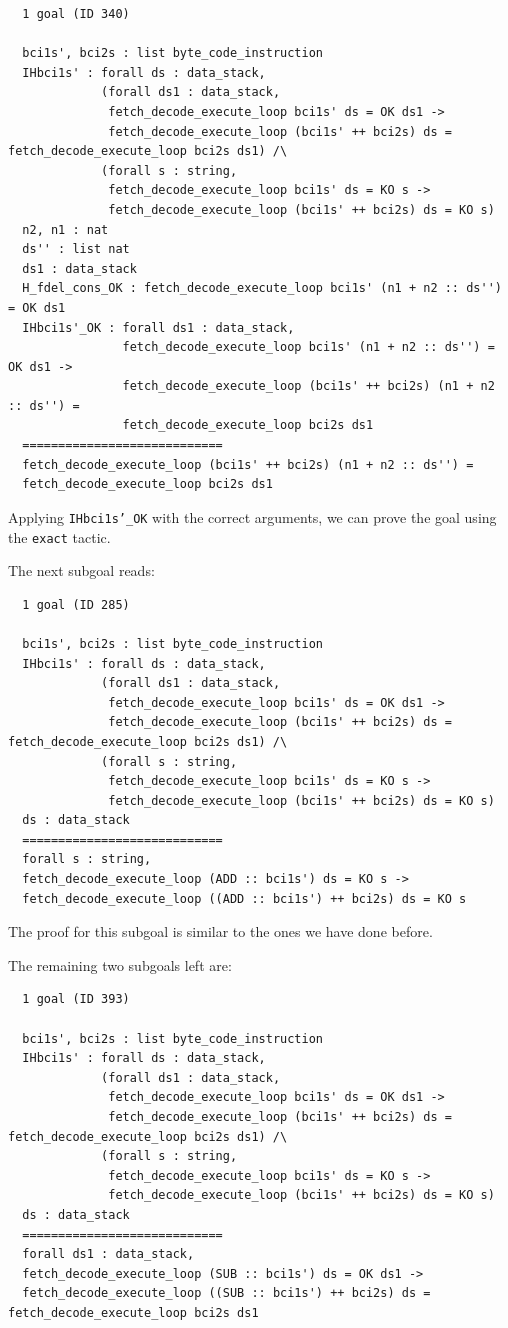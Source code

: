 \documentclass{article}
\begin{document}
\begin{lstlisting}
  1 goal (ID 340)
  
  bci1s', bci2s : list byte_code_instruction
  IHbci1s' : forall ds : data_stack,
             (forall ds1 : data_stack,
              fetch_decode_execute_loop bci1s' ds = OK ds1 ->
              fetch_decode_execute_loop (bci1s' ++ bci2s) ds = fetch_decode_execute_loop bci2s ds1) /\
             (forall s : string,
              fetch_decode_execute_loop bci1s' ds = KO s ->
              fetch_decode_execute_loop (bci1s' ++ bci2s) ds = KO s)
  n2, n1 : nat
  ds'' : list nat
  ds1 : data_stack
  H_fdel_cons_OK : fetch_decode_execute_loop bci1s' (n1 + n2 :: ds'') = OK ds1
  IHbci1s'_OK : forall ds1 : data_stack,
                fetch_decode_execute_loop bci1s' (n1 + n2 :: ds'') = OK ds1 ->
                fetch_decode_execute_loop (bci1s' ++ bci2s) (n1 + n2 :: ds'') =
                fetch_decode_execute_loop bci2s ds1
  ============================
  fetch_decode_execute_loop (bci1s' ++ bci2s) (n1 + n2 :: ds'') =
  fetch_decode_execute_loop bci2s ds1
\end{lstlisting}

Applying \texttt{IHbci1s'\_OK} with the correct arguments, we can prove the goal using the \texttt{exact} tactic.

The next subgoal reads:

\begin{lstlisting}
  1 goal (ID 285)
  
  bci1s', bci2s : list byte_code_instruction
  IHbci1s' : forall ds : data_stack,
             (forall ds1 : data_stack,
              fetch_decode_execute_loop bci1s' ds = OK ds1 ->
              fetch_decode_execute_loop (bci1s' ++ bci2s) ds = fetch_decode_execute_loop bci2s ds1) /\
             (forall s : string,
              fetch_decode_execute_loop bci1s' ds = KO s ->
              fetch_decode_execute_loop (bci1s' ++ bci2s) ds = KO s)
  ds : data_stack
  ============================
  forall s : string,
  fetch_decode_execute_loop (ADD :: bci1s') ds = KO s ->
  fetch_decode_execute_loop ((ADD :: bci1s') ++ bci2s) ds = KO s
\end{lstlisting}

The proof for this subgoal is similar to the ones we have done before. 

The remaining two subgoals left are:

\begin{lstlisting}
  1 goal (ID 393)
  
  bci1s', bci2s : list byte_code_instruction
  IHbci1s' : forall ds : data_stack,
             (forall ds1 : data_stack,
              fetch_decode_execute_loop bci1s' ds = OK ds1 ->
              fetch_decode_execute_loop (bci1s' ++ bci2s) ds = fetch_decode_execute_loop bci2s ds1) /\
             (forall s : string,
              fetch_decode_execute_loop bci1s' ds = KO s ->
              fetch_decode_execute_loop (bci1s' ++ bci2s) ds = KO s)
  ds : data_stack
  ============================
  forall ds1 : data_stack,
  fetch_decode_execute_loop (SUB :: bci1s') ds = OK ds1 ->
  fetch_decode_execute_loop ((SUB :: bci1s') ++ bci2s) ds = fetch_decode_execute_loop bci2s ds1
\end{lstlisting}
\end{document}
